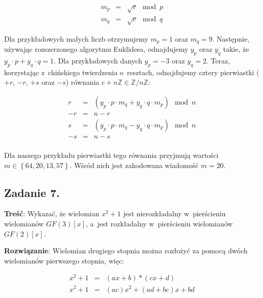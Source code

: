 \documentclass[a4paper,10pt, twocolumn]{article}
\begin{document}
\begin{equation*}
 \begin{array}{lcl} m_{p} & = & \sqrt{c} \mod p \\ m_{q} & = & \sqrt{c} \mod q \end{array}
\end{equation*}

\noindent Dla przykładowych małych liczb otrzymujemy $m_{p} = 1$ oraz $m_{q} = 9$. Następnie, używając rozszerzonego algorytmu Euklidesa, odnajdujemy $y_{p}$ oraz $y_{q}$ takie, że $y_{p} \cdot p + y_{q} \cdot q = 1$. Dla przykładowych danych $y_{p} = -3$ oraz $y_{q} = 2$. Teraz, korzystając z~chińskiego twierdzenia o~resztach, odnajdujemy cztery pierwiastki ($+r$, $-r$, $+s$ oraz $-s$) równania $c + n\mathbb{Z} \in \mathbb{Z}/n\mathbb{Z}$:

\begin{equation*}
 \begin{array}{lcl} r & = & (y_{p} \cdot p \cdot m_{q} + y_{q} \cdot q \cdot m_{p}) \mod n \\ -r & = & n - r \\ s & = & (y_{p} \cdot p \cdot m_{q} - y_{q} \cdot q \cdot m_{p}) \mod n \\ -s & = & n - s \\ \end{array}
\end{equation*}

\noindent Dla naszego przykładu pierwiastki tego równania przyjmują wartości $m \in \left\{ 64, 20, 13, 57 \right\}$. Wśród nich jest zakodowana wiadomość $m = 20$.

\subsection{Zadanie 7.}

\textbf{Treść}: Wykazać, że wielomian $x^{2} + 1$ jest nierozkładalny w~pierścieniu wielomianów $GF(3)[x]$, a~jest rozkładalny w~pierścieniu wielomianów $GF(2)[x]$.

\textbf{Rozwiązanie}: Wielomian drugiego stopnia można rozłożyć za pomocą dwóch wielomianów pierwszego stopnia, więc:

\begin{equation*}
 \begin{array}{lcl} x^{2} + 1 & = & (ax + b) * (cx + d) \\ x^{2} + 1 & = & (ac)x^{2} + (ad + bc)x + bd \\ \end{array}
\end{equation*}
\end{document}
